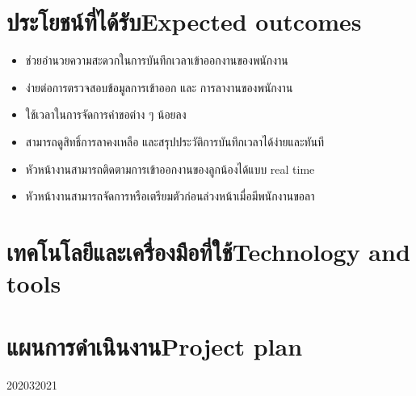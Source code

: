 \section{\ifcpe ประโยชน์ที่ได้รับ\else Expected outcomes\fi}
\begin{itemize}
    \item ช่วยอำนวยความสะดวกในการบันทึกเวลาเข้าออกงานของพนักงาน
    \item ง่ายต่อการตรวจสอบข้อมูลการเข้าออก และ การลางานของพนักงาน
    \item ใช้เวลาในการจัดการคำขอต่าง ๆ น้อยลง
    \item สามารถดูสิทธิ์การลาคงเหลือ และสรุปประวัติการบันทึกเวลาได้ง่ายและทันที
    \item หัวหน้างานสามารถติดตามการเข้าออกงานของลูกน้องได้แบบ real time
    \item หัวหน้างานสามารถจัดการหรือเตรียมตัวก่อนล่วงหน้าเมื่อมีพนักงานขอลา
\end{itemize}
\section{\ifcpe เทคโนโลยีและเครื่องมือที่ใช้\else Technology and tools\fi}
\section{\ifcpe แผนการดำเนินงาน\else Project plan\fi}
\begin{plan}{7}{2020}{3}{2021}
\end{plan}

